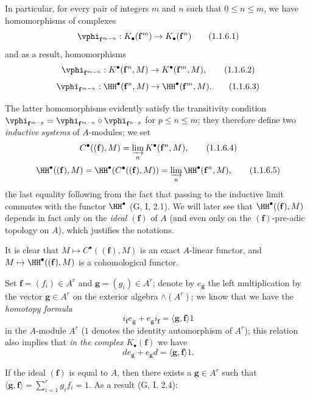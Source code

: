\begin{env}[1.1.6]
\label{III.1.1.6}
In particular, for every pair of integers $m$ and $n$ such that $0\leq n\leq m$, we have homomorphisms of complexes
\[
  \vphi_{\mathbf{f}^{m-n}}:K_\bullet(\mathbf{f}^m)\to K_\bullet(\mathbf{f}^n)
  \tag{1.1.6.1}
\]
and as a result, homomorphisms
\[
  \vphi_{\mathbf{f}^{m-n}}:K^\bullet(\mathbf{f}^n,M)\to K^\bullet(\mathbf{f}^m,M),
  \tag{1.1.6.2}
\]
\[
  \vphi_{\mathbf{f}^{m-n}}:\HH^\bullet(\mathbf{f}^n,M)\to\HH^\bullet(\mathbf{f}^m,M).
  \tag{1.1.6.3}
\]

The latter homomorphisms evidently satisfy the transitivity condition $\vphi_{\mathbf{f}^{m-p}}=\vphi_{\mathbf{f}^{m-n}}\circ\vphi_{\mathbf{f}^{n-p}}$ for $p\leq n\leq m$; they therefore define two \emph{inductive systems} of $A$-modules; we set
\[
  C^\bullet((\mathbf{f}),M)=\varinjlim_n K^\bullet(\mathbf{f}^n,M),
  \tag{1.1.6.4}
\]
\[
  \HH^\bullet((\mathbf{f}),M)=\HH^\bullet(C^\bullet((\mathbf{f}),M))=\varinjlim_n\HH^\bullet(\mathbf{f}^n,M),
  \tag{1.1.6.5}
\]
the last equality following from the fact that passing to the inductive limit commutes with the functor $\HH^\bullet$ (G, I, 2.1).
We will later see  that $\HH^\bullet((\mathbf{f}),M)$ depends in fact only on the \emph{ideal $(\mathbf{f})$} of $A$ (and even only on the $(\mathbf{f})$-pre-adic topology on $A$), which justifies the notations.

It is clear that $M\mapsto C^\bullet((\mathbf{f}),M)$ is an exact $A$-linear functor, and $M\mapsto\HH^\bullet((\mathbf{f}),M)$ is a cohomological functor.
\end{env}

\begin{env}[1.1.7]
\label{III.1.1.7}
Set $\mathbf{f}=(f_i)\in A^r$ and $\mathbf{g}=(g_i)\in A^r$; denote by $e_\mathbf{g}$ the left multiplication by the vector $\mathbf{g}\in A^r$ on the exterior algebra $\wedge(A^r)$; we know that we have the \emph{homotopy formula}
\[
  i_\mathbf{f}e_\mathbf{g}+e_\mathbf{g}i_\mathbf{f}=\langle\mathbf{g},\mathbf{f}\rangle 1
  \tag{1.1.7.1}
\]
in the $A$-module $A^r$ ($1$ denotes the identity automorphism of $A^r$); this relation also implies that \emph{in the complex $K_\bullet(\mathbf{f})$} we have
\[
  de_\mathbf{g}+e_\mathbf{g}d=\langle\mathbf{g},\mathbf{f}\rangle 1.
  \tag{1.1.7.2}
\]

If the ideal $(\mathbf{f})$ is equal to $A$, then there exists a $\mathbf{g}\in A^r$ such that $\langle\mathbf{g},\mathbf{f}\rangle=\sum_{i=1}^r g_i f_i=1$.
As a result (G, I, 2.4):
\end{env}

